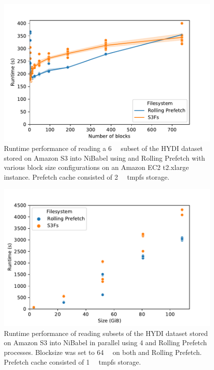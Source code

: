 \begin{figure}
\begin{center}
\includegraphics[width=\columnwidth]{figures/rp/blocksize.pdf}
\caption{Runtime performance of reading a \SI{6}{\gibi\byte} subset of the HYDI
dataset stored on Amazon S3 into NiBabel using \sfs and Rolling Prefetch with
various block size configurations on an Amazon EC2 t2.xlarge instance. Prefetch
cache consisted of  \SI{2}{\gibi\byte} tmpfs storage.}
\label{fig:rp:blocksize}
\end{center}
\end{figure}

\begin{figure}
\begin{center}
\includegraphics[width=\columnwidth]{figures/rp/parallel.pdf}
\caption{Runtime performance of reading subsets of the HYDI dataset stored on
Amazon S3 into NiBabel in parallel using 4 \sfs and Rolling Prefetch processes.
Blocksize was set to \SI{64}{\mebi\byte} on both \sfs and Rolling Prefetch.
Prefetch cache consisted of \SI{1}{\gibi\byte} tmpfs storage.}
\label{fig:rp:parallel}
\end{center}
\end{figure}



